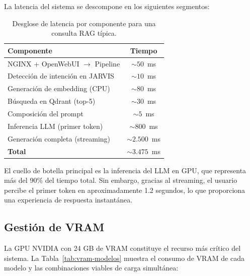 La latencia del sistema se descompone en los siguientes segmentos:

\begin{table}[H]
\centering
\caption{Desglose de latencia por componente para una consulta RAG típica.}
\label{tab:latencia-desglose}
\begin{tabular}{lc}
\toprule
\textbf{Componente} & \textbf{Tiempo} \\
\midrule
NGINX + OpenWebUI $\rightarrow$ Pipeline  & $\sim 50$~ms \\
Detección de intención en JARVIS          & $\sim 10$~ms \\
Generación de embedding (CPU)             & $\sim 80$~ms \\
Búsqueda en Qdrant (top-5)               & $\sim 30$~ms \\
Composición del prompt                    & $\sim 5$~ms \\
Inferencia LLM (primer token)            & $\sim 800$~ms \\
Generación completa (streaming)           & $\sim 2.500$~ms \\
\midrule
\textbf{Total}                            & $\sim 3.475$~ms \\
\bottomrule
\end{tabular}
\end{table}

El cuello de botella principal es la inferencia del LLM en GPU, que representa más del 90\% del tiempo total. Sin embargo, gracias al streaming, el usuario percibe el primer token en aproximadamente 1.2 segundos, lo que proporciona una experiencia de respuesta instantánea.

\subsection{Gestión de VRAM}

La GPU NVIDIA con 24 GB de VRAM constituye el recurso más crítico del sistema. La Tabla~\ref{tab:vram-modelos} muestra el consumo de VRAM de cada modelo y las combinaciones viables de carga simultánea:

